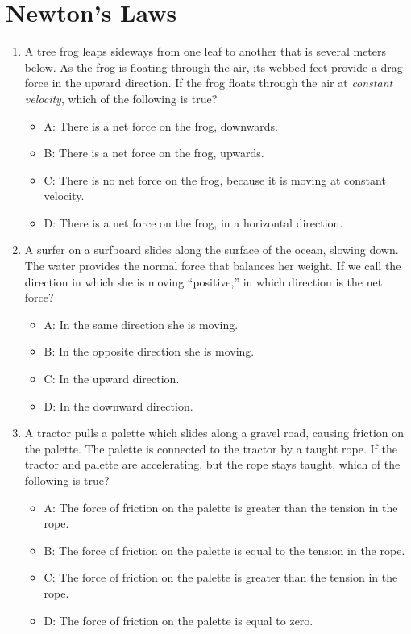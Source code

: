 \documentclass[10pt]{article}
\begin{document}
\section{Newton's Laws}
\begin{enumerate}
\small
\item A tree frog leaps sideways from one leaf to another that is several meters below.  As the frog is floating through the air, its webbed feet provide a drag force in the upward direction.  If the frog floats through the air at \textit{constant velocity}, which of the following is true?
\begin{itemize}
\item A: There is a net force on the frog, downwards.
\item B: There is a net force on the frog, upwards.
\item C: There is no net force on the frog, because it is moving at constant velocity.
\item D: There is a net force on the frog, in a horizontal direction.
\end{itemize}
\item A surfer on a surfboard slides along the surface of the ocean, slowing down.  The water provides the normal force that balances her weight.  If we call the direction in which she is moving ``positive,'' in which direction is the net force?
\begin{itemize}
\item A: In the same direction she is moving.
\item B: In the opposite direction she is moving.
\item C: In the upward direction.
\item D: In the downward direction.
\end{itemize}
\item A tractor pulls a palette which slides along a gravel road, causing friction on the palette.  The palette is connected to the tractor by a taught rope.  If the tractor and palette are accelerating, but the rope stays taught, which of the following is true?
\begin{itemize}
\item A: The force of friction on the palette is greater than the tension in the rope.
\item B: The force of friction on the palette is equal to the tension in the rope.
\item C: The force of friction on the palette is greater than the tension in the rope.
\item D: The force of friction on the palette is equal to zero.

\end{itemize}
\end{enumerate}
\end{document}
